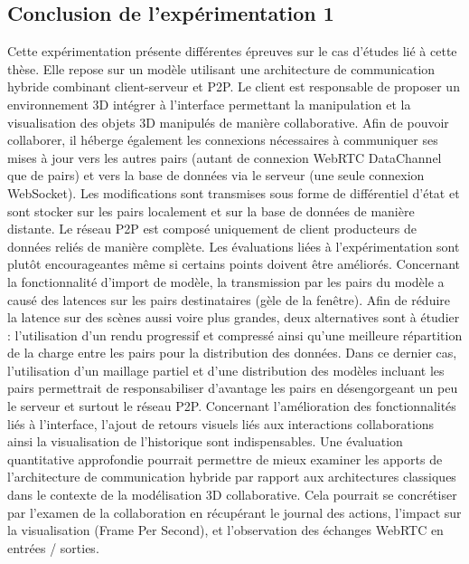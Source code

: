 \subsection{Conclusion de l'expérimentation 1}


Cette expérimentation présente différentes épreuves sur le cas d'études lié à cette 
thèse. Elle repose sur un modèle utilisant une architecture de communication 
hybride combinant client-serveur et \gls{P2P}. Le client est responsable de 
proposer un environnement \gls{3D} intégrer à l'interface permettant la 
manipulation et 
la visualisation des objets \gls{3D} manipulés de manière collaborative. Afin de 
pouvoir 
collaborer, il héberge également les connexions nécessaires à communiquer ses 
mises à jour vers les autres pairs (autant de connexion WebRTC DataChannel que 
de pairs) et vers la base de données via le serveur (une seule connexion 
WebSocket). Les modifications sont transmises sous forme de différentiel d'état et 
sont stocker sur les pairs localement et sur la base de données de manière 
distante. Le réseau \gls{P2P} est composé uniquement de client producteurs de 
données reliés de manière complète. 
Les évaluations liées à l'expérimentation sont plutôt encourageantes même si 
certains points doivent être améliorés. Concernant la fonctionnalité d'import de 
modèle, la transmission par les pairs du modèle a causé des latences sur les 
pairs destinataires (gèle de la fenêtre). Afin de réduire la latence sur des scènes 
aussi voire plus grandes, deux alternatives sont à étudier : l'utilisation d'un 
rendu progressif et compressé ainsi qu'une meilleure répartition de la charge entre 
les pairs pour la distribution des données. Dans ce dernier cas, l'utilisation d'un 
maillage partiel et d'une distribution des modèles incluant les pairs permettrait de 
responsabiliser d'avantage les pairs en désengorgeant un peu le serveur et surtout 
le réseau \gls{P2P}.
Concernant l'amélioration des fonctionnalités liés à l'interface, l'ajout de retours 
visuels liés aux interactions collaborations ainsi la visualisation de l'historique sont 
indispensables. Une évaluation quantitative approfondie pourrait permettre de 
mieux examiner les apports de l'architecture de communication hybride par rapport 
aux architectures classiques dans le contexte de la modélisation \gls{3D} 
collaborative. 
Cela pourrait se concrétiser par l'examen de la collaboration en récupérant le 
journal des actions, l'impact sur la visualisation (Frame Per Second), et 
l'observation des échanges WebRTC en entrées / sorties.


